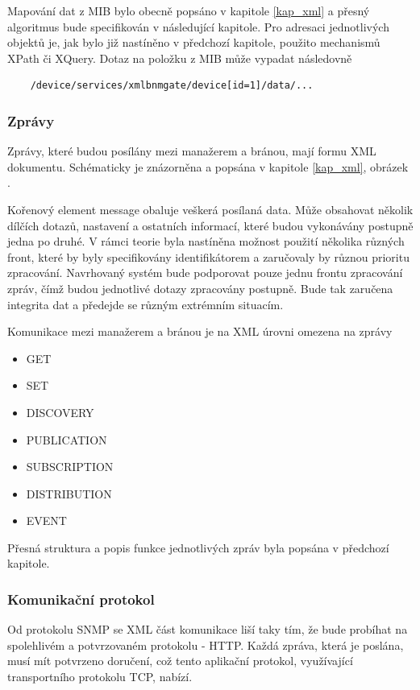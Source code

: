Mapování dat z MIB bylo obecně popsáno v kapitole \ref{kap_xml} a přesný algoritmus bude specifikován v následující kapitole. Pro adresaci jednotlivých objektů
je, jak bylo již nastíněno v předchozí kapitole, použito mechanismů XPath či XQuery. Dotaz na položku z MIB může vypadat následovně
\begin{verbatim}
	/device/services/xmlbnmgate/device[id=1]/data/...
\end{verbatim}

\subsubsection*{Zprávy}
Zprávy, které budou posílány mezi manažerem a bránou, mají formu XML dokumentu. Schématicky je znázorněna a popsána v kapitole \ref{kap_xml}, obrázek .

Kořenový element message obaluje veškerá posílaná data. Může obsahovat několik dílčích dotazů, nastavení a ostatních informací, které budou vykonávány postupně
jedna po druhé. V rámci teorie byla nastíněna možnost použití několika různých front, které by byly specifikovány identifikátorem a zaručovaly by různou
prioritu zpracování. Navrhovaný systém bude podporovat pouze jednu frontu zpracování zpráv, čímž budou jednotlivé dotazy zpracovány postupně. Bude tak zaručena
integrita dat a předejde se různým extrémním situacím.

Komunikace mezi manažerem a bránou je na XML úrovni omezena na zprávy
\begin{itemize}
	\item GET
	\item SET
	\item DISCOVERY
	\item PUBLICATION
	\item SUBSCRIPTION
	\item DISTRIBUTION
	\item EVENT
\end{itemize}

Přesná struktura a popis funkce jednotlivých zpráv byla popsána v předchozí kapitole.


\subsubsection*{Komunikační protokol}
Od protokolu SNMP se XML část komunikace liší taky tím, že bude probíhat na spolehlivém a potvrzovaném protokolu - HTTP. Každá zpráva, která
je poslána, musí mít potvrzeno doručení, což tento aplikační protokol, využívající transportního protokolu TCP, nabízí. 

